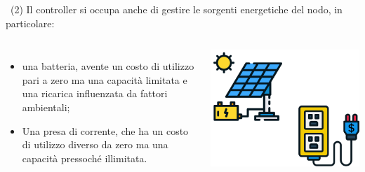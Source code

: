 \documentclass[compress]{beamer}
\begin{document}
\begin{frame}{\subsubsecname\ (2)}
    Il controller si occupa anche di gestire le sorgenti energetiche del nodo, in particolare:
    \vspace{0.5cm}
        \begin{columns}
                \begin{minipage}[b]{1\textwidth}
                    \begin{itemize}
                        \item una batteria,
                        avente un costo di utilizzo pari a zero ma una capacità limitata e una ricarica influenzata
                        da fattori ambientali;
                        \item Una presa di corrente, che ha un costo di utilizzo diverso
                        da zero ma una capacità pressoché illimitata.
                    \end{itemize}
                \end{minipage}
                \begin{minipage}{.9\textwidth}
                    \begin{adjustbox}{margin=0.5cm 0cm 0.1cm 0.2cm, center} %
                        \includegraphics[width=1\textwidth]{figs/socket_battery.png}
                    \end{adjustbox}
                \end{minipage}
        \end{columns}
    \end{frame}
\end{document}

